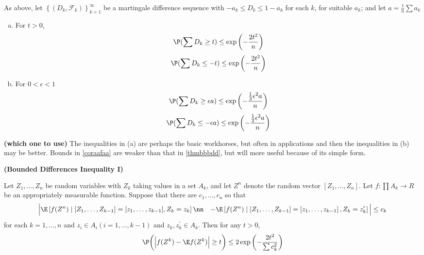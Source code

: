 \documentclass{article}
\newcommand{\bfs}[1]{\textbf{({#1})}}
\begin{document}
\begin{cora}\label{coraafaa}
As above, let $\left\{\left(D_{k}, \mathcal{F}_{k}\right)\right\}_{k=1}^{\infty}$ be a martingale difference sequence with $-a_{k} \leq D_{k} \leq 1-a_{k}$ for each $k$, for suitable  $a_{k}$; and let $a=\frac{1}{n} \sum a_{k}$
\begin{enumerate}[(a)]
    \item For $t>0$,
\begin{align}
    \P( \sum D_{ k } \ge t )\leq \exp\left(-\frac{2 t ^{2} }{ n} \right)\label{eq416a1}
\end{align}
\begin{align}
    \P( \sum D_{ k } \leq-t ) \leq \exp\left(-\frac{2 t ^{2}}{ n} \right)\label{eq416a2}
\end{align}
\item For $0<\epsilon<1$
\begin{align}
    \P( \sum D_{ k } \ge \epsilon a ) \leq \exp\left(-\frac{\frac{1}{3}\epsilon^2a }{ n} \right)\label{eq416b1}
\end{align}
\begin{align}
    \P(\sum D_{ k } \le -\epsilon a ) \leq \exp\left(-\frac{\frac{1}{2}\epsilon^2a }{ n} \right)\label{eq416b2}
\end{align}
\end{enumerate}
\end{cora} 
\begin{rema}{\bfs{which one to use}}
The inequalities in (a) are perhaps the basic workhorses, but often  in applications and then the inequalities in (b) may be better. Bounds in \cref{coraafaa} are weaker than that in \cref{thmbbbdd}, but will more useful because of its simple form.
\end{rema}

\begin{thma}{\bfs{Bounded Differences Inequality I}}\label{thmadiff}

Let $Z_{1}, \ldots, Z_{ n }$ be random variables with $Z_{ k }$ taking values in a set $A_{k}$, and let $Z^n$ denote the random vector $\left[Z_{1}, \ldots, Z_{n}\right] .$ Let $f: \prod A_{k} \rightarrow R$ be an appropriately measurable function. Suppose that there are  $c_{1}, \ldots, c_{n}$ so
that
\begin{align}
\Big|&\E \left[ f (Z^n) \mid [Z _{1}, \ldots, Z _{ k -1}]=[z _{1}, \ldots, z_{ k -1}], Z_{ k }= z_{ k }\right] \nn
&- \E \left[ f (Z^n) \mid\left[ Z_{1}, \ldots, Z_{ k -1}\right]=\left[ z_{1}, \ldots, z_{ k -1}\right], Z_{ k }= z_{ k }^{\prime}\right] \Big| \leq c_{ k }\label{eqcondi}
\end{align}   
for each $k =1, \ldots, n$ and $z_{i} \in A _{ i }( i =1, \ldots, k -1)$ and $z _{ k }, z _{ k }^{\prime} \in A _{ k }$. Then for any $t >0$,
$$
\P\bigg(\Big| f (Z^k)- \E f (Z^k)\Big| \geq t \bigg) \leq 2 \exp \left(-\frac{2 t ^{2} }{\sum c_{ k }^{2}}\right)
$$
\end{thma}
\end{document}
